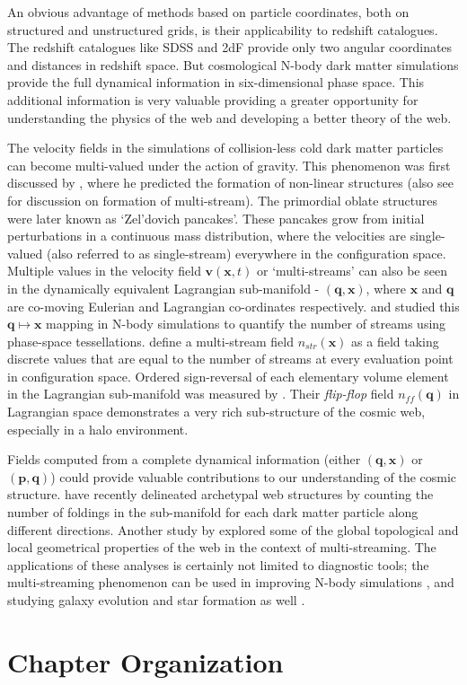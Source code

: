 An obvious advantage of methods based on particle coordinates, both on structured and unstructured grids, is their applicability to redshift catalogues. The redshift catalogues like SDSS and 2dF provide only two angular coordinates and distances in redshift space. But cosmological N-body dark matter simulations provide the full dynamical information in six-dimensional phase space. This additional information is very valuable providing a greater opportunity for understanding the physics of the web and developing a better theory of the web.


The velocity fields in the simulations of collision-less cold dark matter particles can become multi-valued under the action of gravity. This phenomenon was first discussed by \cite{Zeldovich1970}, where he predicted the formation of non-linear structures (also see \citealt{Shandarin1989} for discussion on formation of multi-stream). The primordial oblate structures were later known as `Zel'dovich pancakes'. These pancakes grow from initial perturbations in a continuous mass distribution, where the velocities are single-valued (also referred to as single-stream) everywhere in the configuration space. Multiple values in the velocity field $\mathbf{v} (\mathbf{x},t)$ or `multi-streams' can also be seen in the dynamically equivalent Lagrangian sub-manifold - $(\mathbf{q}, \mathbf{x})$, where $\mathbf{x}$ and $\mathbf{q}$ are co-moving Eulerian and Lagrangian co-ordinates respectively. \cite{Shandarin2011} and \cite{Abel2012b} studied this $ \mathbf{q} \mapsto \mathbf{x}$ mapping in N-body simulations to quantify the number of streams using phase-space tessellations. \cite{Shandarin2011} define a multi-stream field $n_{str}(\mathbf{x})$ as a field taking discrete values that are equal to the number of streams at every evaluation point in configuration space. Ordered sign-reversal of each elementary volume element in the Lagrangian sub-manifold was measured by \cite{Shandarin2014a}. Their {\it flip-flop} field $n_{ff}(\mathbf{q})$ in Lagrangian space demonstrates a very rich sub-structure of the cosmic web, especially in a halo environment. 

Fields computed from a complete dynamical information (either $(\mathbf{q}, \mathbf{x})$ or $(\mathbf{p}, \mathbf{q})$) could provide valuable contributions to our understanding of the cosmic structure. \cite{Falck2012} have recently delineated archetypal web structures by counting the number of foldings in the sub-manifold for each dark matter particle along different directions. Another study by \cite{Ramachandra2016a} explored some of the global topological and local geometrical properties of the web in the context of multi-streaming. The applications of these analyses is certainly not limited to diagnostic tools; the multi-streaming phenomenon can be used in improving N-body simulations \citep{Hahn2013}, and studying galaxy evolution and star formation as well \citep{Aragon-Calvo2016b}. 

\section{Chapter Organization}